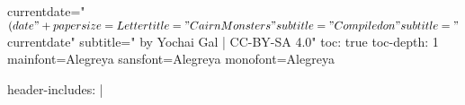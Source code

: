 currentdate="$(date "+%
papersize=Letter
title="Cairn Monsters"
subtitle="Compiled on "
subtitle="$currentdate"
subtitle=" by Yochai Gal | CC-BY-SA 4.0"
toc: true
toc-depth: 1
mainfont=Alegreya
sansfont=Alegreya
monofont=Alegreya

header-includes: |
    \usepackage[paperheight=8.5in,paperwidth=5.5in, margin=0.5in]{geometry}
    \usepackage[utf8]{inputenc}
    
    
